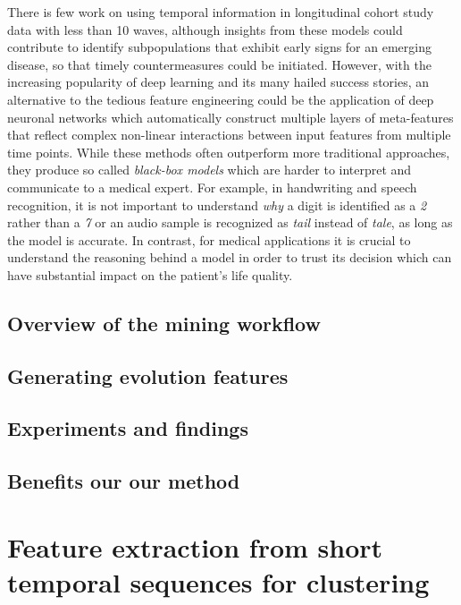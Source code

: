 \documentclass[
]{book}
\begin{document}
There is few work on using temporal information in longitudinal cohort study data with less than 10 waves,
although insights from these models could contribute to identify subpopulations that exhibit early signs for an emerging disease, so that timely countermeasures could be initiated.
However, with the increasing popularity of deep learning and its many hailed success stories, an alternative to the tedious feature engineering could be the application of deep neuronal networks which automatically construct multiple layers of meta-features that reflect complex non-linear interactions between input features from multiple time points.
While these methods often outperform more traditional approaches, they produce so called \emph{black-box models} which are harder to interpret and communicate to a medical expert.
For example, in handwriting and speech recognition, it is not important to understand \emph{why} a digit is identified as a \emph{2} rather than a \emph{7} or an audio sample is recognized as \emph{tail} instead of \emph{tale}, as long as the model is accurate.
In contrast, for medical applications it is crucial to understand the reasoning behind a model in order to trust its decision which can have substantial impact on the patient's life quality.

\hypertarget{overview-of-the-mining-workflow}{%
\section{Overview of the mining workflow}\label{overview-of-the-mining-workflow}}

\hypertarget{generating-evolution-features}{%
\section{Generating evolution features}\label{generating-evolution-features}}

\hypertarget{experiments-and-findings-2}{%
\section{Experiments and findings}\label{experiments-and-findings-2}}

\hypertarget{benefits-our-our-method-1}{%
\section{Benefits our our method}\label{benefits-our-our-method-1}}

\hypertarget{diabfoot}{%
\chapter{Feature extraction from short temporal sequences for clustering}\label{diabfoot}}
\end{document}
